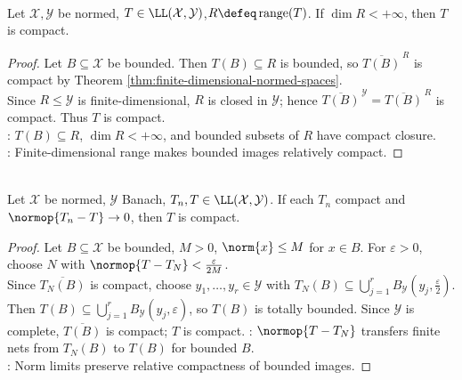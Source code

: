 \begin{proposition} \label{prop:finite-rank-operators-compact} \\
Let $\mathcal{X},\mathcal{Y}$ be normed, $T\in\LL(\mathcal{X},\mathcal{Y})$,$R\defeq\operatorname{range}(T)$. If $\dim R<+\infty$, then $T$ is compact.
\begin{proof} Let $B\subseteq\mathcal{X}$ be bounded. Then $T(B)\subseteq R$ is bounded, so $\overline{T(B)}^{\,R}$ is compact by Theorem \ref{thm:finite-dimensional-normed-spaces}.\\
Since $R\leq\mathcal{Y}$ is finite-dimensional, $R$ is closed in $\mathcal{Y}$; hence $\overline{T(B)}^{\,\mathcal{Y}}=\overline{T(B)}^{\,R}$ is compact. Thus $T$ is compact.\\
: $T(B)\subseteq R$, $\dim R<+\infty$, and bounded subsets of $R$ have compact closure.\\
: Finite-dimensional range makes bounded images relatively compact.
\end{proof}
\end{proposition}

\begin{theorem} \label{thm:compact-operator-closed-under-norm-limits} \\
Let $\mathcal{X}$ be normed, $\mathcal{Y}$ Banach, $T_n,T\in\LL(\mathcal{X},\mathcal{Y})$. If each $T_n$ compact and $\normop{T_n-T}\to0$, then $T$ is compact.
\begin{proof} Let $B\subseteq\mathcal{X}$ be bounded, $M>0$, $\norm{x}\leq M$ for $x\in B$. For $\varepsilon>0$, choose $N$ with $\normop{T-T_N}<\frac{\varepsilon}{2M}$.\\
Since $\overline{T_N(B)}$ is compact, choose $y_1,\ldots,y_r\in\mathcal{Y}$ with $T_N(B)\subseteq\bigcup_{j=1}^r B_{\mathcal{Y}}(y_j,\frac{\varepsilon}{2})$.\\
Then $T(B)\subseteq\bigcup_{j=1}^r B_{\mathcal{Y}}(y_j,\varepsilon)$, so $T(B)$ is totally bounded. Since $\mathcal{Y}$ is complete, $\overline{T(B)}$ is compact; $T$ is compact.
: $\normop{T-T_N}$ transfers finite nets from $T_N(B)$ to $T(B)$ for bounded $B$.\\
: Norm limits preserve relative compactness of bounded images.
\end{proof}
\end{theorem}

